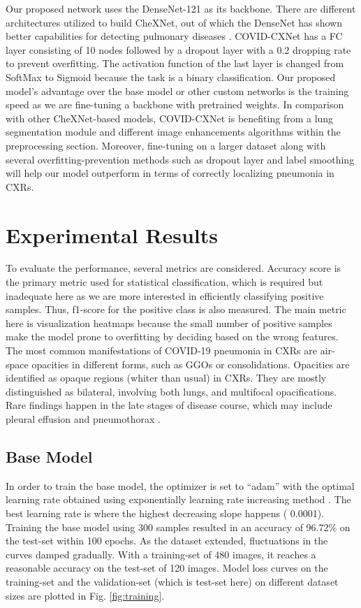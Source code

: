 \documentclass{article}
\begin{document}
\noindent Our proposed network uses the DenseNet-121 as its backbone. There are different architectures utilized to build CheXNet, out of which the DenseNet has shown better capabilities for detecting pulmonary diseases \cite{rajpurkar2017chexnet}. COVID-CXNet has a FC layer consisting of 10 nodes followed by a dropout layer with a 0.2 dropping rate to prevent overfitting. The activation function of the last layer is changed from SoftMax to Sigmoid because the task is a binary classification. Our proposed model's advantage over the base model or other custom networks is the training speed as we are fine-tuning a backbone with pretrained weights. In comparison with other CheXNet-based models, COVID-CXNet is benefiting from a lung segmentation module and different image enhancements algorithms within the preprocessing section. Moreover, fine-tuning on a larger dataset along with several overfitting-prevention methods such as dropout layer and label smoothing will help our model outperform in terms of correctly localizing pneumonia in CXRs.


\section{Experimental Results} \label{results}
To evaluate the performance, several metrics are considered. Accuracy score is the primary metric used for statistical classification, which is required but inadequate here as we are more interested in efficiently classifying positive samples. Thus, f1-score for the positive class is also measured. The main metric here is visualization heatmaps because the small number of positive samples make the model prone to overfitting by deciding based on the wrong features. The most common manifestations of COVID-19 pneumonia in CXRs are air-space opacities in different forms, such as GGOs or consolidations. Opacities are identified as opaque regions (whiter than usual) in CXRs. They are mostly distinguished as bilateral, involving both lungs, and multifocal opacifications. Rare findings happen in the late stages of disease course, which may include pleural effusion and pneumothorax \cite{jacobi2020portable}.






\subsection{Base Model} \label{base_model_res}
In order to train the base model, the optimizer is set to “adam” with the optimal learning rate obtained using exponentially learning rate increasing method \cite{smith2017cyclical}. The best learning rate is where the highest decreasing slope happens ( 0.0001). Training the base model using 300 samples resulted in an accuracy of 96.72\% on the test-set within 100 epochs. As the dataset extended, fluctuations in the curves damped gradually. With a training-set of 480 images, it reaches a reasonable accuracy on the test-set of 120 images. Model loss curves on the training-set and the validation-set (which is test-set here) on different dataset sizes are plotted in Fig. \ref{fig:training}.
\end{document}
